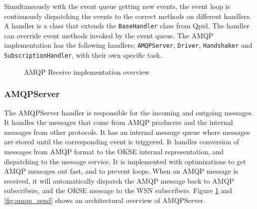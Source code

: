 Simultaneously with the event queue getting new events, the event loop is continuously dispatching the events to the correct methods on different handlers. A handler is a class that extends the \verb!BaseHandler! class from Qpid. The handler can override event methods invoked by the event queue. The AMQP implementation has the following handlers; \verb!AMQPServer!, \verb!Driver!, \verb!Handshaker! and \verb!SubscriptionHandler!, with their own specific task.

\begin{center}
  \begin{figure}[ht!]
    \caption{AMQP Receive implementation overview}
    \label{fig:amqp_recv}
  \end{figure}
\end{center}

\subsubsection{AMQPServer}
The AMQPServer handler is responsible for the incoming and outgoing messages. It handles the messages that come from AMQP producers and the internal messages from other protocols. It has an internal message queue where messages are stored until the corresponding event is triggered. It handles conversion of messages from AMQP format to the OKSE internal representation, and dispatching to the message service. It is implemented with optimizations to get AMQP messages out fast, and to prevent loops. When an AMQP message is received, it will automatically dispatch the AMQP message back to AMQP subscribers, and the OKSE message to the WSN subscribers. Figure \ref{fig:amqp_recv} and \ref{fig:amqp_send} shows an architectural overview of AMQPServer.

